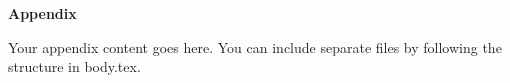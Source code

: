{\noindent\fontsize{14}{21}\selectfont\textbf{Appendix}}

\vspace{0.8cm}

Your appendix content goes here. You can include separate files by following
the structure in body.tex.
